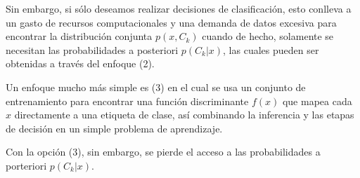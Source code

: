 	Sin embargo, si sólo deseamos realizar decisiones de clasificación, esto conlleva a un gasto de recursos computacionales y una demanda de datos excesiva para encontrar la distribución conjunta $p(x, C_k)$ cuando de hecho, solamente se necesitan las probabilidades a posteriori $p(C_k \vert x)$, las cuales pueden ser obtenidas a través del enfoque (2). 
		
	Un enfoque mucho más simple es (3) en el cual se usa un conjunto de entrenamiento para encontrar una función discriminante $f(x)$ que mapea cada $x$ directamente a una etiqueta de clase, así combinando la inferencia y las etapas de decisión en un simple problema de aprendizaje.
		
	Con la opción (3), sin embargo, se pierde el acceso a las probabilidades a porteriori $p(C_k \vert x)$. 